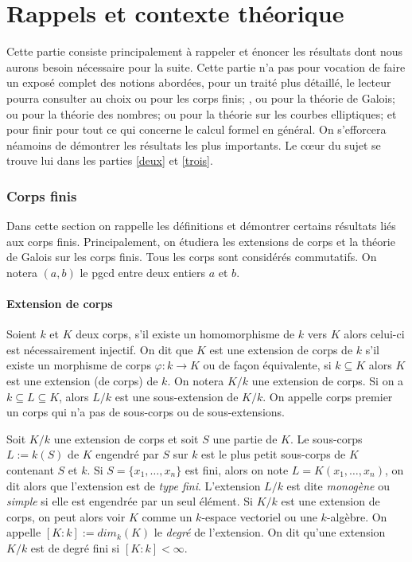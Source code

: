 \documentclass[a4paper]{article} %
\numberwithin{section}{part}
\numberwithin{equation}{section}
\begin{document}
\part{Rappels et contexte théorique}
\label{un}

Cette partie consiste principalement à rappeler et énoncer les résultats dont
nous aurons besoin nécessaire pour la suite. Cette partie n'a pas pour 
vocation de faire un exposé complet des notions abordées, pour un traité plus 
détaillé, le lecteur pourra consulter au choix \cite{LiNi1} ou 
\cite[chap.~III]{Per} pour les corps finis; \cite[chap.~VI]{Sam}, \cite{Lan1} ou
\cite{Esc} pour la théorie de Galois; \cite{Sam} ou \cite{Lan2} pour la théorie 
des nombres; \cite{Sil} ou \cite{Was2} pour la théorie sur les courbes 
elliptiques; et pour finir \cite{GaGe} pour tout ce qui concerne le calcul 
formel en général. On s'efforcera néamoins de démontrer les résultats les plus 
importants. Le c\oe{}ur du sujet se trouve lui dans les parties \ref{deux} et 
\ref{trois}.

\section{Corps finis}
Dans cette section on rappelle les définitions et démontrer certains 
résultats liés aux corps finis. Principalement, on étudiera les extensions 
de corps et la théorie de Galois sur les corps finis. Tous les corps sont
considérés commutatifs. On notera $(a,b)$ le pgcd entre deux entiers $a$ et $b$.


\subsection{Extension de corps}
\label{def:degext}
Soient $k$ et $K$ deux corps, s'il existe un homomorphisme de $k$ vers $K$ alors
celui-ci est nécessairement injectif. On dit que $K$ est une extension de corps 
de $k$ s'il existe un morphisme de corps $\varphi : k \to K$ ou de façon 
équivalente, si $k \subseteq K$ alors $K$ est une extension (de corps) de $k$. 
On notera $K/k$ une extension de corps. Si on a $k\subseteq L \subseteq K$, 
alors $L/k$ est une sous-extension de $K/k$. On appelle corps premier un corps 
qui n'a pas de sous-corps ou de sous-extensions.\par
Soit $K/k$ une extension de corps et soit $S$ une partie de $K$. Le sous-corps 
$L := k(S)$ de $K$ engendré par $S$ sur $k$ est le plus petit sous-corps de $K$ 
contenant $S$ et $k$. Si $S = \lbrace x_1,\dots,x_n \rbrace$ est fini, alors on 
note $L = K(x_1,\dots,x_n)$, on dit alors que l'extension est de \emph{type
fini}. L'extension $L/k$ est dite \emph{monogène} ou \emph{simple} si elle est
engendrée par un seul élément. Si $K/k$ est une extension de corps, on peut
alors voir $K$ comme un $k$-espace vectoriel ou une $k$-algèbre. On appelle 
$[K:k] := dim_k(K)$ le \emph{degré} de l'extension. On dit qu'une extension 
$K/k$ est de degré fini si $[K:k] < \infty$.\par
\end{document}
